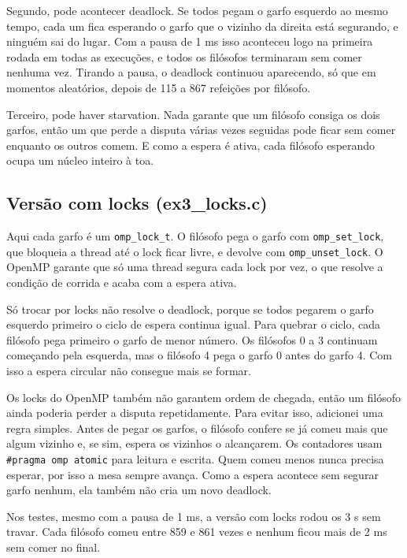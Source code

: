 \documentclass[11pt,a4paper]{article}
\begin{document}
Segundo, pode acontecer deadlock. Se todos pegam o garfo esquerdo ao mesmo tempo, cada um fica esperando o garfo que o vizinho da direita está segurando, e ninguém sai do lugar. Com a pausa de 1 ms isso aconteceu logo na primeira rodada em todas as execuções, e todos os filósofos terminaram sem comer nenhuma vez. Tirando a pausa, o deadlock continuou aparecendo, só que em momentos aleatórios, depois de 115 a 867 refeições por filósofo.

Terceiro, pode haver starvation. Nada garante que um filósofo consiga os dois garfos, então um que perde a disputa várias vezes seguidas pode ficar sem comer enquanto os outros comem. E como a espera é ativa, cada filósofo esperando ocupa um núcleo inteiro à toa.

\subsection{Versão com locks (ex3\_locks.c)}

Aqui cada garfo é um \texttt{omp\_lock\_t}. O filósofo pega o garfo com \texttt{omp\_set\_lock}, que bloqueia a thread até o lock ficar livre, e devolve com \texttt{omp\_unset\_lock}. O OpenMP garante que só uma thread segura cada lock por vez, o que resolve a condição de corrida e acaba com a espera ativa.

Só trocar por locks não resolve o deadlock, porque se todos pegarem o garfo esquerdo primeiro o ciclo de espera continua igual. Para quebrar o ciclo, cada filósofo pega primeiro o garfo de menor número. Os filósofos 0 a 3 continuam começando pela esquerda, mas o filósofo 4 pega o garfo 0 antes do garfo 4. Com isso a espera circular não consegue mais se formar.

Os locks do OpenMP também não garantem ordem de chegada, então um filósofo ainda poderia perder a disputa repetidamente. Para evitar isso, adicionei uma regra simples. Antes de pegar os garfos, o filósofo confere se já comeu mais que algum vizinho e, se sim, espera os vizinhos o alcançarem. Os contadores usam \texttt{\#pragma omp atomic} para leitura e escrita. Quem comeu menos nunca precisa esperar, por isso a mesa sempre avança. Como a espera acontece sem segurar garfo nenhum, ela também não cria um novo deadlock.

Nos testes, mesmo com a pausa de 1 ms, a versão com locks rodou os 3 s sem travar. Cada filósofo comeu entre 859 e 861 vezes e nenhum ficou mais de 2 ms sem comer no final.
\end{document}
